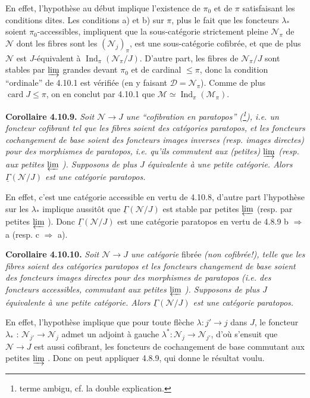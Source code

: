 \documentclass[11pt]{article}
\newcommand{\printedpage}[1]{\marginpar{\footnotesize p.~#1}}
\newcommand{\msp}[1]{\marginpar{\footnotesize [#1]}}
\newcommand{\uGamma}{\underline{\Gamma}}
\newcommand{\Ind}{\operatorname{Ind}}
\begin{document}
En effet, l'hypothèse au début implique l'existence de $\pi_0$ et de $\pi$ satisfaisant les conditions dites. Les conditions a) et b) sur $\pi$, plus le fait que les foncteurs $\lambda_*$ soient $\pi_0$-accessibles, impliquent que la sous-catégorie strictement pleine $\mathcal{N}_\pi$ de $\mathcal{N}$ dont les fibres sont les $(\mathcal{N}_j)_\pi$, est une sous-catégorie cofibrée, et que de plus $\mathcal{N}$ est $J$-équivalent à $\Ind_\pi(\mathcal{N}_\pi/J)$. D'autre part, les fibres de $\mathcal{N}_\pi/J$ sont stables par $\varinjlim$ grandes devant $\pi_0$ et de cardinal $\leqslant \pi$, donc la condition “ordinale” de 4.10.1 est vérifiée (en y faisant $\mathcal{D} = \mathcal{N}_\pi$). Comme de plus $\operatorname{card} J \leqslant \pi$, on en conclut par 4.10.1 que $\mathcal{M} \simeq \Ind_\pi(\mathcal{M}_\pi)$.

\msp{page 265}

\textbf{Corollaire 4.10.9.} \textit{Soit $\mathcal{N} \longrightarrow J$ une “cofibration en paratopos” (\footnote{terme ambigu, cf. la double explication.}), i.e. un foncteur cofibrant tel que les fibres soient des catégories paratopos, et les foncteurs cochangement de base soient des foncteurs images inverses (resp. images directes) pour des morphismes de paratopos, i.e. qu'ils commutent aux (petites) $\varinjlim$ (resp. aux petites $\varprojlim$ ). Supposons de plus $J$ équivalente à une petite catégorie. Alors $\uGamma(\mathcal{N}/J)$ est une catégorie paratopos.}

En effet, c'est une catégorie accessible en vertu de 4.10.8, d'autre part l'hypothèse sur les $\lambda_*$ implique aussitôt que $\uGamma(\mathcal{N}/J)$ est stable par petites $\varprojlim$ (resp. par petites $\varprojlim$
\printedpage{100}
). Donc $\uGamma(\mathcal{N}/J)$ est une catégorie paratopos en vertu de 4.8.9 b $\Longrightarrow$ a (resp. c $\Longrightarrow$ a).

\textbf{Corollaire 4.10.10.} \textit{Soit $\mathcal{N} \longrightarrow J$ une catégorie} fibrée \textit{(non cofibrée!), telle que les fibres soient des catégories paratopos et les foncteurs} \msp{page 266} \textit{changement de base soient des foncteurs images directes pour des morphismes de paratopos (i.e. des foncteurs accessibles, commutant aux petites $\varprojlim$ ). Supposons de plus $J$ équivalente à une petite catégorie. Alors $\uGamma(\mathcal{N}/J)$ est une catégorie paratopos.}

En effet, l'hypothèse implique que pour toute flèche $\lambda : j' \longrightarrow j$ dans $J$, le foncteur $\lambda_*$ : $\mathcal{N}_{j'} \longrightarrow \mathcal{N}_j$ admet un adjoint à gauche $\lambda^* : \mathcal{N}_j \longrightarrow \mathcal{N}_{j'}$, d'où s'ensuit que $\mathcal{N} \longrightarrow J$ est aussi cofibrant, les foncteurs de cochangement de base commutant aux petites $\varinjlim$ . Donc on peut appliquer 4.8.9, qui donne le résultat voulu.
\end{document}

